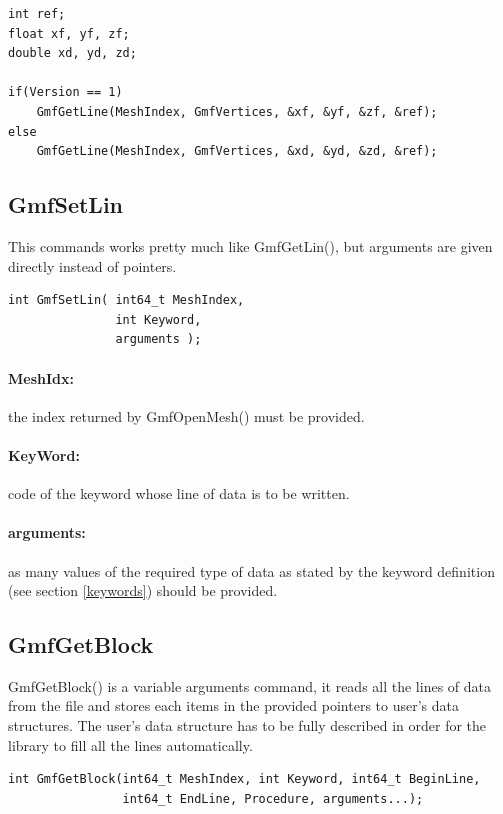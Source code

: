 \documentclass[a4paper,12pt]{article}
\begin{document}
\begin{tt}
\begin{verbatim}
int ref;
float xf, yf, zf;
double xd, yd, zd;

if(Version == 1)
    GmfGetLine(MeshIndex, GmfVertices, &xf, &yf, &zf, &ref);
else
    GmfGetLine(MeshIndex, GmfVertices, &xd, &yd, &zd, &ref);
\end{verbatim}
\end{tt}
\normalfont


\subsection{GmfSetLin}
This commands works pretty much like GmfGetLin(), but arguments are given directly instead of pointers.

\begin{tt}
\begin{verbatim}
int GmfSetLin( int64_t MeshIndex,
               int Keyword,
               arguments );
\end{verbatim}
\end{tt}
\normalfont

\paragraph{MeshIdx:}
the index returned by GmfOpenMesh() must be provided.

\paragraph{KeyWord:} code of the keyword whose line of data is to be written.

\paragraph{arguments:} as many values of the required type of data as stated by the keyword definition (see section \ref{keywords}) should be provided.


\subsection{GmfGetBlock}
GmfGetBlock() is a variable arguments command, it reads all the lines of data from the file and stores each items in the provided pointers to user's data structures. The user's data structure has to be fully described in order for the library to fill all the lines automatically.

\begin{tt}
\begin{verbatim}
int GmfGetBlock(int64_t MeshIndex, int Keyword, int64_t BeginLine, 
                int64_t EndLine, Procedure, arguments...);
\end{verbatim}
\end{tt}
\normalfont
\end{document}
